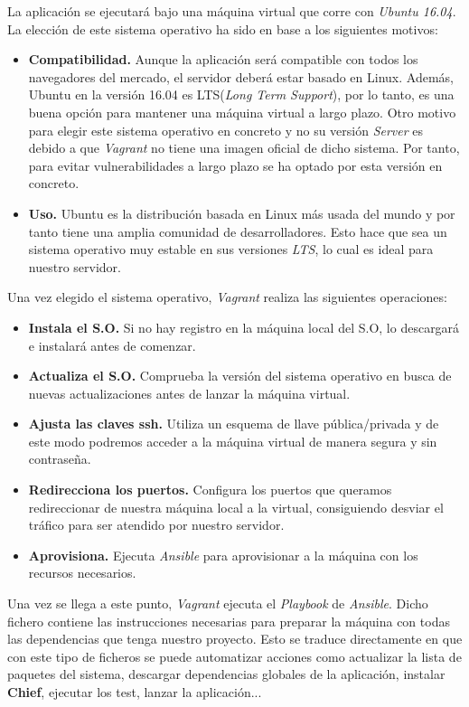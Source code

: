La aplicación se ejecutará bajo una máquina virtual que corre con \textit{Ubuntu 16.04}. La elección de este sistema operativo ha sido en base a los siguientes motivos:
\begin{itemize}
	\item \textbf{Compatibilidad.} Aunque la aplicación será compatible con todos los navegadores del mercado, el servidor deberá estar basado en Linux. Además, 
	Ubuntu en la versión 16.04 es LTS(\textit{Long Term Support}), por lo tanto, es una buena opción para mantener una máquina virtual a largo plazo. Otro motivo para
	elegir este sistema operativo en concreto y no su versión \textit{Server} es debido a que \textit{Vagrant} no tiene una imagen oficial de dicho sistema. Por tanto,
	para evitar vulnerabilidades a largo plazo se ha optado por esta versión en concreto.
	
	\item \textbf{Uso.} Ubuntu es la distribución basada en Linux más usada del mundo\cite{ubuntu-usage} y por tanto tiene una amplia comunidad de desarrolladores. Esto
	hace que sea un sistema operativo muy estable en sus versiones \textit{LTS}, lo cual es ideal para nuestro servidor.
\end{itemize}

Una vez elegido el sistema operativo, \textit{Vagrant} realiza las siguientes operaciones:

\begin{itemize}
	\item \textbf{Instala el S.O.} Si no hay registro en la máquina local del S.O, lo descargará e instalará antes de comenzar.
	\item \textbf{Actualiza el S.O.} Comprueba la versión del sistema operativo en busca de nuevas actualizaciones antes de lanzar la máquina virtual.
	\item \textbf{Ajusta las claves ssh.} Utiliza un esquema de llave pública/privada y de este modo podremos acceder a la máquina virtual de manera segura y sin contraseña.
	\item \textbf{Redirecciona los puertos.} Configura los puertos que queramos redireccionar de nuestra máquina local a la virtual, consiguiendo desviar el tráfico 
	para ser atendido por nuestro servidor.
	\item \textbf{Aprovisiona.} Ejecuta \textit{Ansible} para aprovisionar a la máquina con los recursos necesarios.
\end{itemize}

Una vez se llega a este punto, \textit{Vagrant} ejecuta el \textit{Playbook} de \textit{Ansible}. Dicho fichero contiene las instrucciones necesarias para 
preparar la máquina con todas las dependencias que tenga nuestro proyecto. Esto se traduce directamente en que con este tipo de ficheros se puede automatizar acciones
como actualizar la lista de paquetes del sistema, descargar dependencias globales de la aplicación, instalar \textbf{Chief}, ejecutar los test, lanzar la aplicación...\\

